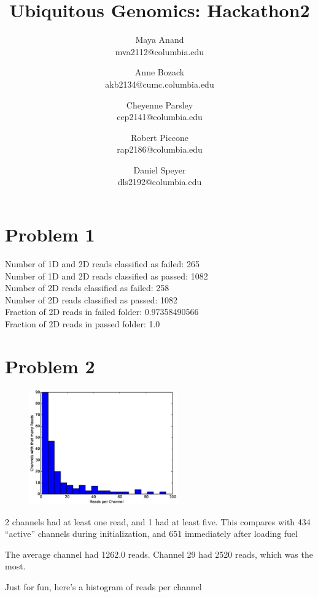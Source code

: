 \documentclass[11pt]{article}
\title{Ubiquitous Genomics: Hackathon2}
\author{
  Maya Anand\\ mva2112@columbia.edu \and
  Anne Bozack\\ akb2134@cumc.columbia.edu \and
  Cheyenne Parsley\\ cep2141@columbia.edu \and
  Robert Piccone\\ rap2186@columbia.edu \and
  Daniel Speyer\\ dls2192@columbia.edu}
\begin{document}
\maketitle
\section*{Problem 1}
Number of 1D and 2D reads classified as failed: 265\\
Number of 1D and 2D reads classified as passed: 1082\\
Number of 2D reads classified as failed: 258\\
Number of 2D reads classified as passed: 1082\\
Fraction of 2D reads in failed folder: 0.97358490566\\
Fraction of 2D reads in passed folder: 1.0\\
\section*{Problem 2}
\begin{figure}
  \vspace{-20pt}
  \includegraphics[width=2.5in]{part2hist}
  \vspace{-20pt}
\end{figure}
2 channels had at least one read, and 1 had at least five.  
This compares with 434 ``active'' channels during initialization, and 651 immediately after loading fuel

The average channel had 1262.0 reads. 
Channel 29 had 2520 reads, which was the most.

Just for fun, here's a histogram of reads per channel\\
\end{document}
